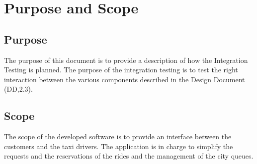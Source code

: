 \documentclass[../../../../testPlan.tex]{subfiles}
\begin{document}
	\section{Purpose and Scope}

		\subsection{Purpose}
			The purpose of this document is to provide a description of how the Integration Testing is planned. The purpose of the integration testing is to test the right interaction between the various components described in the Design Document (DD,2.3).

		\subsection{Scope}
			The scope of the developed software is to provide an interface between the customers and the taxi drivers. The application is in charge to simplify the requests and the reservations of the rides and the management of the city queues.
\end{document}
